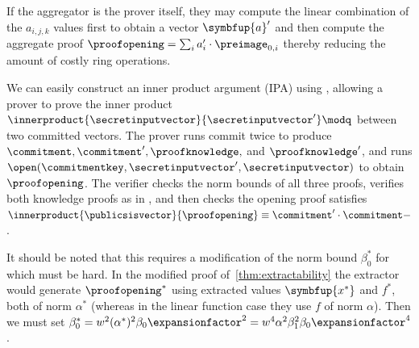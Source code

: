 If the aggregator is the prover itself, they may compute the linear combination of the $a_{i,j,k}$ values first to obtain a vector $\symbfup{a}'$ and then compute the aggregate proof $\proofopening = \sum_i a'_{i} \cdot \preimage_{0,i} $ thereby reducing the amount of costly ring operations.

We can easily construct an inner product argument (IPA) using \sys, allowing a prover to prove the inner product $\output \defeq \innerproduct{\secretinputvector}{\secretinputvector'} \modq$ between two committed vectors. The prover runs commit twice to produce $\commitment,\commitment',\proofknowledge,$ and $\proofknowledge'$, and runs $\open(\commitmentkey,\secretinputvector',\secretinputvector)$ to obtain $\proofopening$. The verifier checks the norm bounds of all three proofs, verifies both knowledge proofs as in \verify, and then checks the opening proof satisfies $\innerproduct{\publicsisvector}{\proofopening} \equiv \commitment' \cdot \commitment - \output \modq$.

It should be noted that this requires a modification of the norm bound $\beta_0^{*}$ for which \rsis must be hard. In the modified proof of~\cref{thm:extractability} the extractor would generate $\proofopening^*$ using extracted values $\symbfup{x^*}$ and $f^*$, both of norm $\alpha^*$ (whereas in the linear function case they use $f$ of norm $\alpha$). Then we must set $\beta_{0}^* = w^2 (\alpha^*)^2 \beta_0 \expansionfactor^2 = w^4 \alpha^2 \beta_{1}^2 \beta_0 \expansionfactor^4$.




